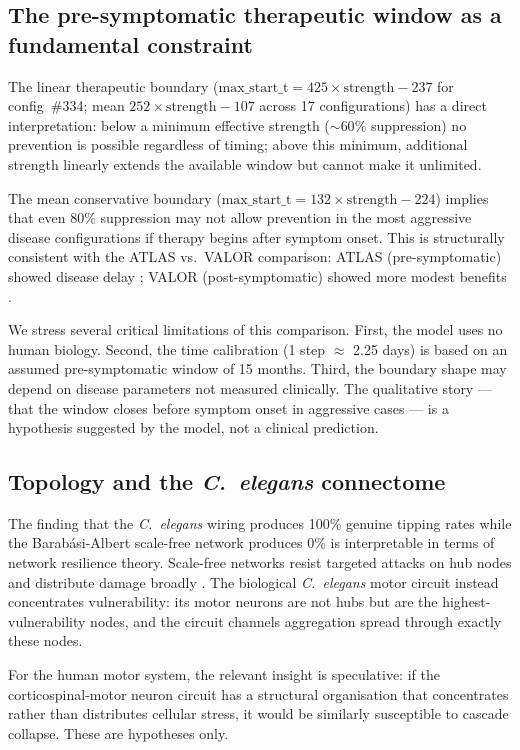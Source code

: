 \documentclass[12pt,a4paper]{article}
\begin{document}
\subsection{The pre-symptomatic therapeutic window as a fundamental constraint}

The linear therapeutic boundary ($\mathrm{max\_start\_t} = 425 \times \text{strength} - 237$ for
config~\#334; mean $252 \times \text{strength} - 107$ across 17 configurations) has a direct
interpretation: below a minimum effective strength (${\sim}60\%$ suppression) no prevention is
possible regardless of timing; above this minimum, additional strength linearly extends the
available window but cannot make it unlimited.

The mean conservative boundary ($\mathrm{max\_start\_t} = 132 \times \text{strength} - 224$)
implies that even 80\% suppression may not allow prevention in the most aggressive disease
configurations if therapy begins after symptom onset. This is structurally consistent with the
ATLAS vs.\ VALOR comparison: ATLAS (pre-symptomatic) showed disease delay \citep{benatar2023};
VALOR (post-symptomatic) showed more modest benefits \citep{miller2022}.

We stress several critical limitations of this comparison. First, the model uses no human
biology. Second, the time calibration (1 step $\approx$ 2.25 days) is based on an assumed
pre-symptomatic window of 15 months. Third, the boundary shape may depend on disease parameters
not measured clinically. The qualitative story --- that the window closes before symptom onset
in aggressive cases --- is a hypothesis suggested by the model, not a clinical prediction.

\subsection{Topology and the \textit{C.~elegans} connectome}

The finding that the \textit{C.~elegans} wiring produces 100\% genuine tipping rates while
the Barab\'{a}si-Albert scale-free network produces 0\% is interpretable in terms of network
resilience theory. Scale-free networks resist targeted attacks on hub nodes and distribute
damage broadly \citep{albert2000}. The biological \textit{C.~elegans} motor circuit instead
concentrates vulnerability: its motor neurons are not hubs but are the highest-vulnerability
nodes, and the circuit channels aggregation spread through exactly these nodes.

For the human motor system, the relevant insight is speculative: if the corticospinal-motor
neuron circuit has a structural organisation that concentrates rather than distributes cellular
stress, it would be similarly susceptible to cascade collapse. These are hypotheses only.
\end{document}
